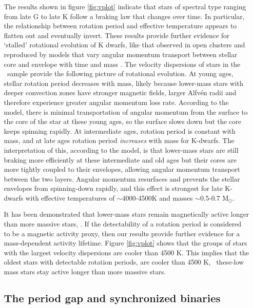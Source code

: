 The results shown in figure \ref{fig:vplot} indicate that stars of spectral
type ranging from late G to late K follow a braking law that changes over
time.
In particular, the relationship between rotation period and effective
temperature appears to flatten out and eventually invert.
These results provide further evidence for `stalled' rotational evolution of K
dwarfs, like that observed in open clusters \citep{curtis2019} and reproduced
by models that vary angular momentum transport between stellar core and
envelope with time and mass \citep{spada2019}.
The velocity dispersions of stars in the \mct\ sample provide the following
picture of rotational evolution.
At young ages, stellar rotation period decreases with mass, likely because
lower-mass stars with deeper convection zones have stronger magnetic fields,
larger Alfv\'en radii and therefore experience greater angular momentum loss
rate.
According to the \citet{spada2019} model, there is minimal transportation of
angular momentum from the surface to the core of the star at these young ages,
so the surface slows down but the core keeps spinning rapidly.
At intermediate ages, rotation period is constant with mass, and at late ages
rotation period {\it increases} with mass for K-dwarfs.
The interpretation of this, according to the \citet{spada2019} model, is that
lower-mass stars are still braking more efficiently at these intermediate and
old ages but their cores are more tightly coupled to their envelopes, allowing
angular momentum transport between the two layers.
Angular momentum resurfaces and prevents the stellar envelopes from
spinning-down rapidly, and this effect is strongest for late K-dwarfs with
effective temperatures of $\sim$4000-4500K and masses $\sim$0.5-0.7 M$_\odot$.

It has been demonstrated that lower-mass stars remain magnetically active
longer than more massive stars, \citep{west2008, kiman2019}.
If the detectability of a rotation period is considered to be a magnetic
activity proxy, then our results provide further evidence for a mass-dependent
activity lifetime.
Figure \ref{fig:vplot} shows that the groups of stars with the largest
velocity dispersions are cooler than 4500 K.
This implies that the oldest stars with detectable rotation periods, are
cooler than 4500 K, \ie\ these-low mass stars stay active longer than more
massive stars.

\subsection{The period gap and synchronized binaries}
\label{sec:gap}

